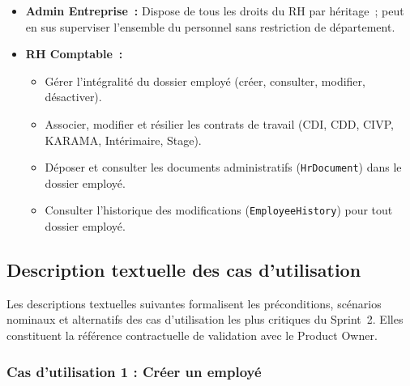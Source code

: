  \begin{itemize}
    \item \textbf{Admin Entreprise~:}
          Dispose de tous les droits du RH par héritage~; peut en sus
          superviser l'ensemble du personnel sans restriction de département.

    \item \textbf{RH Comptable~:}
          \begin{itemize}
            \item Gérer l'intégralité du dossier employé (créer, consulter,
                  modifier, désactiver).
            \item Associer, modifier et résilier les contrats de travail
                  (CDI, CDD, CIVP, KARAMA, Intérimaire, Stage).
            \item Déposer et consulter les documents administratifs
                  (\texttt{HrDocument}) dans le dossier employé.
            \item Consulter l'historique des modifications
                  (\texttt{EmployeeHistory}) pour tout dossier employé.
          \end{itemize}
  \end{itemize}

\subsection{Description textuelle des cas d'utilisation}

Les descriptions textuelles suivantes formalisent les préconditions,
scénarios nominaux et alternatifs des cas d'utilisation les plus
critiques du Sprint~2. Elles constituent la référence contractuelle de
validation avec le Product Owner.

\subsubsection{Cas d'utilisation 1 : Créer un employé}

